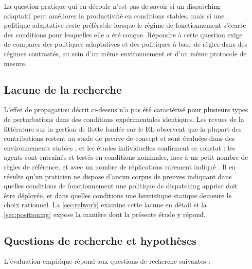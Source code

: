 \documentclass[11pt,a4paper]{article}
\begin{document}
La question pratique qui en découle n'est pas de savoir si un dispatching adaptatif peut améliorer la productivité en conditions stables, mais si une politique adaptative reste préférable lorsque le régime de fonctionnement s'écarte des conditions pour lesquelles elle a été conçue. Répondre à cette question exige de comparer des politiques adaptatives et des politiques à base de règles dans des régimes contrastés, au sein d'un même environnement et d'un même protocole de mesure.

\subsection{Lacune de la recherche}
\label{sec:gap}

L'effet de propagation décrit ci-dessus n'a pas été caractérisé pour plusieurs types de perturbations dans des conditions expérimentales identiques. Les revues de la littérature sur la gestion de flotte fondée sur le RL observent que la plupart des contributions restent au stade de preuve de concept et sont évaluées dans des environnements stables \cite{Hazrathosseini2024}, et les études individuelles confirment ce constat : les agents sont entraînés et testés en conditions nominales, face à un petit nombre de règles de référence, et avec un nombre de réplications rarement indiqué \cite{deCarvalho2023, Zhao2025, Pei2025, FranciscoRosales2025}. Il en résulte qu'un praticien ne dispose d'aucun corpus de preuves indiquant dans quelles conditions de fonctionnement une politique de dispatching apprise doit être déployée, et dans quelles conditions une heuristique statique demeure le choix rationnel. La \cref{sec:relwork} examine cette lacune en détail et la \cref{sec:positioning} expose la manière dont la présente étude y répond.

\subsection{Questions de recherche et hypothèses}
\label{sec:rq}

L'évaluation empirique répond aux questions de recherche suivantes :
\end{document}
